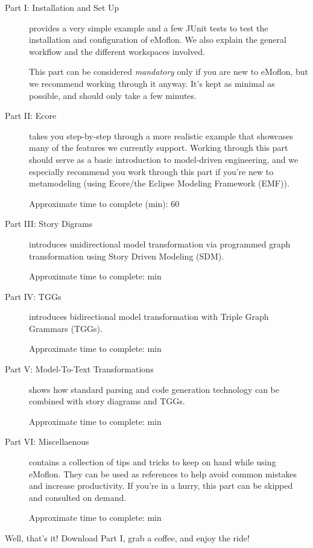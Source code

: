 \begin{description}

\item[Part I: Installation and Set Up] provides a very simple example and a few JUnit tests to test the installation and configuration of eMoflon. We also explain the general workflow and the different workspaces involved.

This part can be considered \emph{mandatory} only if you are new to eMoflon, but we recommend working through it anyway.
It's kept as minimal as possible, and should only take a few minutes.

\item[Part II: Ecore] takes you step-by-step through a more realistic example that showcases many of the features we currently support.
Working through this part should serve as a basic introduction to model-driven engineering, and we especially recommend you work through this part if you're new to metamodeling (using Ecore/the Eclipse Modeling Framework (EMF)).

{\small Approximate time to complete (min): 60 }

\item[Part III: Story Digrams] introduces unidirectional model transformation via programmed graph transformation using Story Driven Modeling (SDM).

{\small Approximate time to complete: min }

\item[Part IV: TGGs] introduces bidirectional model transformation with Triple Graph Grammars (TGGs).

{\small Approximate time to complete: min }

\item[Part V: Model-To-Text Transformations] shows how standard parsing and code generation technology can be combined with story diagrams and TGGs.

{\small Approximate time to complete: min }

\item[Part VI: Miscellaenous] contains a collection of tips and tricks to keep on hand while using eMoflon. They can be used as references to help avoid common mistakes and increase productivity. If you're in a hurry, this part can be skipped and consulted on demand.

{\small Approximate time to complete: min }

\end{description}

Well, that's it! Download Part I, grab a coffee, and enjoy the ride!

